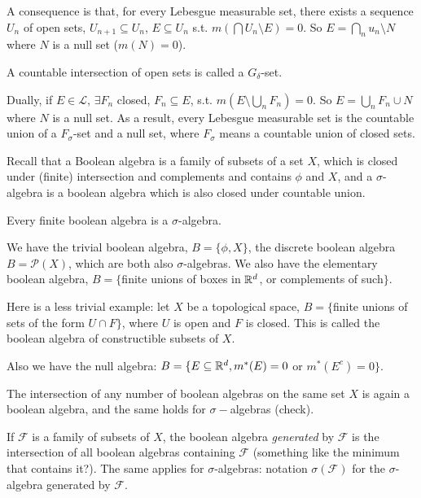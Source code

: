 \documentclass[a4paper]{article}
\begin{document}
A consequence is that, for every Lebesgue measurable set, there exists a sequence $U_n$ of open sets, $U_{n+1}\subseteq U_n$, $E \subseteq U_n$ s.t. $m(\bigcap U_n \setminus E) = 0$. So $E = \bigcap_n u_n \setminus N$ where $N$ is a null set ($m(N)=0$).

\begin{rem}
A countable intersection of open sets is called a $G_\delta$-set.\\
\end{rem}

Dually, if $E \in \mathcal{L}$, $\exists F_n$ closed, $F_n \subseteq E$, s.t. $m(E \setminus \bigcup_n F_n) = 0$. So $E = \bigcup_n F_n \cup N$ where $N$ is a null set. As a result, every Lebesgue measurable set is the  countable union of a $F_\sigma$-set and a null set, where $F_\sigma$ means a countable union of closed sets.

Recall that a Boolean algebra is a family of subsets of a set $X$, which is closed under (finite) intersection and complements and contains $\phi$ and $X$, and a $\sigma$-algebra is a boolean algebra which is also closed under countable union.

\begin{rem}
Every finite boolean algebra is a $\sigma$-algebra.
\end{rem}

\begin{eg}
We have the trivial boolean algebra, $B=\{\phi,X\}$, the discrete boolean algebra $B = \mathcal{P}(X)$, which are both also $\sigma$-algebras. We also have the elementary boolean algebra, $B=\{$finite unions of boxes in $\mathbb{R}^d$, or complements of such$\}$.

Here is a less trivial example: let $X$ be a topological space, $B=\{$finite unions of sets of the form $U \cap F\}$, where $U$ is open and $F$ is closed. This is called the boolean algebra of constructible subsets of $X$.

Also we have the null algebra: $B = \{E \subseteq \mathbb{R}^d, m^*(E) =0$ or $m^*(E^c) =0 \}$.
\end{eg}

\begin{rem}
The intersection of any number of boolean algebras on the same set $X$ is again a boolean algebra, and the same holds for $\sigma-$algebras (check).
\end{rem}

\begin{defi}
If $\mathcal{F}$ is a family of subsets of $X$, the boolean algebra \emph{generated} by $\mathcal{F}$ is the intersection of all boolean algebras containing $\mathcal{F}$ (something like the minimum that contains it?).
The same applies for $\sigma$-algebras: notation $\sigma(\mathcal{F})$ for the $\sigma$-algebra generated by $\mathcal{F}$.
\end{defi}
\end{document}
